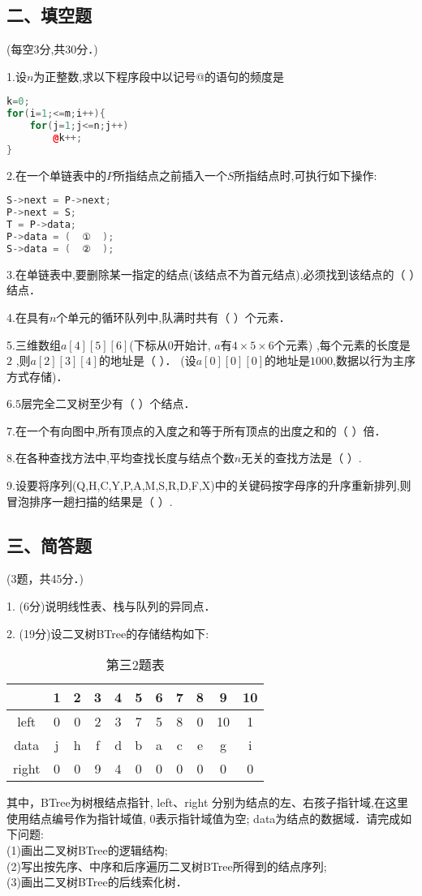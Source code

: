 \subsection{二、填空题}
(每空3分,共30分．)

1.设$n$为正整数,求以下程序段中以记号@的语句的频度是 \\
\begin{lstlisting}[language=cpp]
k=0;
for(i=1;<=m;i++){
    for(j=1;j<=n;j++)
        @k++;
}
\end{lstlisting}

2.在一个单链表中的$P$所指结点之前插入一个$S$所指结点时,可执行如下操作:  \\
\begin{lstlisting}[language=cpp]
S->next = P->next;
P->next = S;
T = P->data;
P->data = (  ①  );
S->data = (  ②  );
\end{lstlisting}

3.在单链表中,要删除某一指定的结点(该结点不为首元结点),必须找到该结点的（    ）结点．

4.在具有$n$个单元的循环队列中,队满时共有（    ）个元素．

5.三维数组$a[4][5][6]$(下标从$0$开始计, $a$有$4\times5\times6$个元素) ,每个元素的长度是$2$ ,则$a[2][3][4]$的地址是（    ）． (设$a[0][0][0]$的地址是$1000$,数据以行为主序方式存储)．

6.$5$层完全二叉树至少有（    ）个结点．

7.在一个有向图中,所有顶点的入度之和等于所有顶点的出度之和的（    ）倍．

8.在各种查找方法中,平均查找长度与结点个数$n$无关的查找方法是（    ）.

9.设要将序列(Q,H,C,Y,P,A,M,S,R,D,F,X)中的关键码按字母序的升序重新排列,则冒泡排序一趟扫描的结果是（    ）.

\subsection{三、简答题}
(3题，共45分．)

1. (6分)说明线性表、栈与队列的异同点．

2. (19分)设二叉树BTree的存储结构如下:
\begin{table}[ht]
\centering
\caption{第三2题表}\label{ZSDS11_tab1}
\begin{tabular}{|c|c|c|c|c|c|c|c|c|c|c|}
\hline
 & 1 & 2 & 3 & 4 & 5 & 6 & 7 & 8 & 9 & 10 \\
\hline
left & 0 & 0 & 2 & 3 & 7 & 5 & 8 & 0 & 10 & 1 \\
\hline
data & j & h & f & d & b & a & c & e & g & i \\
\hline
right & 0 & 0 & 9 & 4 & 0 & 0 & 0 & 0 & 0 & 0 \\
\hline
\end{tabular}
\end{table}
其中，BTree为树根结点指针, left、right 分别为结点的左、右孩子指针域,在这里使用结点编号作为指针域值, 0表示指针域值为空; data为结点的数据域．请完成如下问题: \\
(1)画出二叉树BTree的逻辑结构; \\
(2)写出按先序、中序和后序遍历二叉树BTree所得到的结点序列; \\
(3)画出二叉树BTree的后线索化树．




